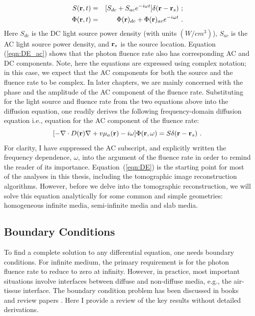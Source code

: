 \begin{eqnarray}
\label{eqn:DE_ac}
S(\mathbf{r},t) & = & [S_{dc} + S_{ac}e^{-i\omega t}]\delta(\mathbf{r}-\mathbf{r}_s) \ ;\\
\label{I_AC}
\Phi(\mathbf{r},t) & = & \Phi(\mathbf{r})_{dc} + \Phi(\mathbf{r})_{ac}e^{-i\omega t} \ .
\end{eqnarray}
%
\noindent
Here $S_{dc}$ is the DC light source power density (with units $(W/cm^{3})$), $S_{ac}$ is the AC light source power density, and $\mathbf{r}_s$ is the source location. Equation (\ref{eqn:DE_ac}) shows that the photon fluence rate also has corresponding AC and DC components. Note, here the equations are expressed using complex notation; in this case, we expect that the AC components for both the source and the fluence rate to be complex. In later chapters, we are mainly concerned with the phase and the amplitude of the AC component of the fluence rate. Substituting for the light source and fluence rate from the two equations above into the diffusion equation, one readily derives the following frequency-domain diffusion equation i.e., equation for the AC component of the fluence rate: 
%
\begin{equation}
\label{eqn:DE}
[-\nabla \cdot D(\mathbf{r}) \nabla + v \mu_a(\mathbf{r})-i\omega]\Phi({\bf
  r},\omega)=S\delta(\mathbf{r}-\mathbf{r}_s) \ .
\end{equation}
%
\noindent
For clarity, I have suppressed the AC subscript, and explicitly written the frequency dependence, $\omega$, into the argument of the fluence rate in order to remind the reader of its importance.  Equation~(\ref{eqn:DE}) is the starting point for most of the analyses in this thesis, including the tomographic image reconstruction algorithms. However, before we delve into the tomographic reconstruction, we will solve this equation analytically for some common and simple geometries: homogeneous infinite media, semi-infinite media and slab media.

\subsection{Boundary Conditions}
To find a complete solution to any differential equation, one needs boundary conditions. For infinite medium, the primary requirement is for the photon fluence rate to reduce to zero at infinity. However, in practice, most important situations involve interfaces between diffuse and non-diffuse media, e.g., the air-tissue interface. The boundary condition problem has been discussed in books and review papers \cite{Haskell1994,Aronson1993,Aronson1995,Contini1997, Durduran2010}. Here I provide a review of the key results without detailed derivations.

